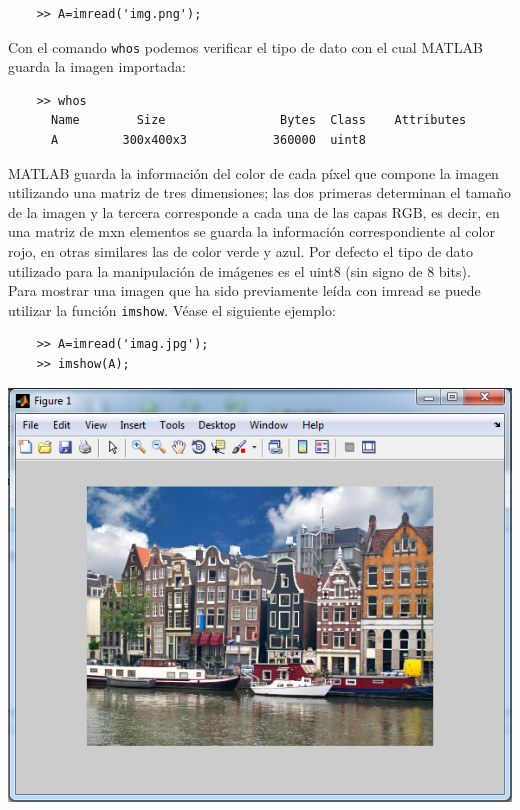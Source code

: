 \begin{verbatim}
	>> A=imread('img.png');
\end{verbatim}

Con el comando \texttt{whos} podemos verificar el tipo de dato con el cual MATLAB guarda la imagen importada:

\begin{verbatim}
	>> whos
	  Name        Size                Bytes  Class    Attributes
	  A         300x400x3            360000  uint8    
\end{verbatim}

MATLAB guarda la información del color de cada píxel que compone la imagen utilizando 
una matriz de tres dimensiones; las dos primeras determinan el tamaño de la imagen y la 
tercera corresponde a cada una de las capas RGB, es decir, en una matriz de mxn elementos 
se guarda la información correspondiente al color rojo, en otras similares las de color 
verde y azul. Por defecto el tipo de dato utilizado para la manipulación de imágenes 
es el uint8 (sin signo de 8 bits).\\

Para mostrar una imagen que ha sido previamente leída con imread se puede utilizar la 
función \texttt{imshow}. Véase el siguiente ejemplo:

\begin{verbatim}
	>> A=imread('imag.jpg');
	>> imshow(A);
\end{verbatim}

\begin{center}
\includegraphics[scale=0.7]{src/ch7/holland_imshow.png}
\end{center}

